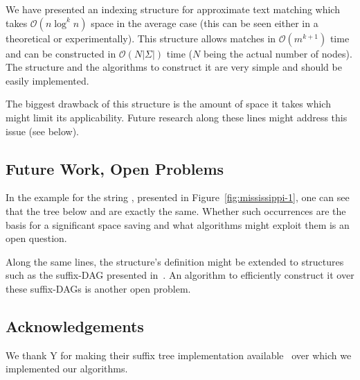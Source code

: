 We have presented an indexing structure for approximate text matching which takes $\mathcal{O}(n\log^k n)$ space in the average case (this can be seen either in a theoretical or experimentally). This structure allows matches in $\mathcal{O}(m^{k+1})$ time and can be constructed in $\mathcal{O}(N|\Sigma|)$ time ($N$ being the actual number of nodes). The structure and the algorithms to construct it are very simple and should be easily implemented.

The biggest drawback of this structure is the amount of space it takes which might limit its applicability. Future research along these lines might address this issue (see below). 

\subsection{Future Work, Open Problems}\label{sec:future}

In the example for the string , presented in Figure~\ref{fig:mississippi-1}, one can see that the tree below  and  are exactly the same. Whether such occurrences are the basis for a significant space saving and what algorithms might exploit them is an open question.

Along the same lines, the structure's definition might be extended to structures such as the suffix-DAG presented in~\cite[7.7]{gusfield:algorithms}. An algorithm to efficiently construct it over these suffix-DAGs is another open problem.

\subsection{Acknowledgements}

We thank Y for making their suffix tree implementation available~\cite{} over which we implemented our algorithms.
